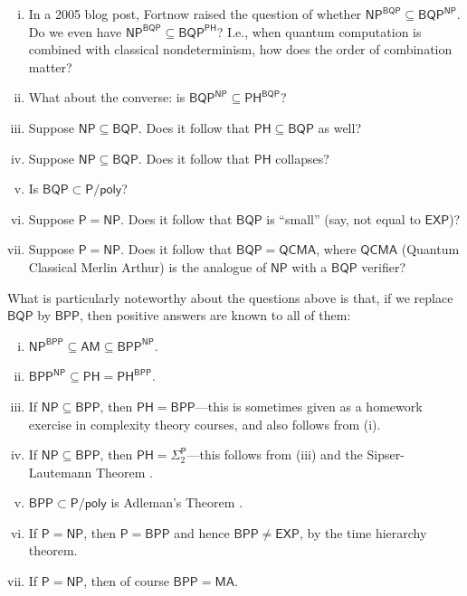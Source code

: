 \documentclass[10pt,a4paper]{article}
\begin{document}
\begin{enumerate}[(i)]
\item In a 2005 blog post, Fortnow \cite{For05} raised the question of whether $\mathsf{NP^{BQP}} \subseteq \mathsf{BQP^{NP}}$. Do we even have $\mathsf{NP^{BQP}} \subseteq \mathsf{BQP^{PH}}$? I.e., when quantum computation is combined with classical nondeterminism, how does the order of combination matter?
\item What about the converse: is $\mathsf{BQP^{NP}} \subseteq \mathsf{PH^{BQP}}$? 

\item Suppose $\mathsf{NP} \subseteq \mathsf{BQP}$.  Does it follow that $\mathsf{PH} \subseteq \mathsf{BQP}$ as well?

\item Suppose $\mathsf{NP} \subseteq \mathsf{BQP}$.  Does it follow that $\mathsf{PH}$ collapses?

\item Is $\mathsf{BQP} \subset \mathsf{P/poly}$?

\item Suppose $\mathsf{P} = \mathsf{NP}$.  Does it follow that $\mathsf{BQP}$ is ``small'' (say, not equal to $\mathsf{EXP}$)?

\item Suppose $\mathsf{P} = \mathsf{NP}$.  Does it follow that $\mathsf{BQP} = \mathsf{QCMA}$, where $\mathsf{QCMA}$ (Quantum Classical Merlin Arthur) is the analogue of $\mathsf{NP}$ with a $\mathsf{BQP}$ verifier?
\end{enumerate}

What is particularly noteworthy about the questions above is that, if we replace $\mathsf{BQP}$ by $\mathsf{BPP}$, then positive answers are known to all of them:

\begin{enumerate}[(i)]
\item $\mathsf{NP}^\mathsf{BPP} \subseteq \mathsf{AM} \subseteq \mathsf{BPP}^\mathsf{NP}$.
\item $\mathsf{BPP}^\mathsf{NP} \subseteq \mathsf{PH} = \mathsf{PH}^\mathsf{BPP}$.
\item If $\mathsf{NP} \subseteq \mathsf{BPP}$, then $\mathsf{PH} = \mathsf{BPP}$---this is sometimes given as a homework exercise in complexity theory courses, and also follows from (i).

\item If $\mathsf{NP} \subseteq \mathsf{BPP}$, then $\mathsf{PH} = \mathsf{\Sigma}_2^\mathsf{P}$---this follows from (iii) and the Sipser-Lautemann Theorem \cite{Sip83,Lau83}.

\item $\mathsf{BPP} \subset \mathsf{P/poly}$ is Adleman's Theorem \cite{Adl78}.

\item If $\mathsf{P}=\mathsf{NP}$, then $\mathsf{P}=\mathsf{BPP}$ and hence $\mathsf{BPP}\neq\mathsf{EXP}$, by the time hierarchy theorem.

\item If $\mathsf{P}=\mathsf{NP}$, then of course $\mathsf{BPP} = \mathsf{MA}$.
\end{enumerate}
\end{document}
